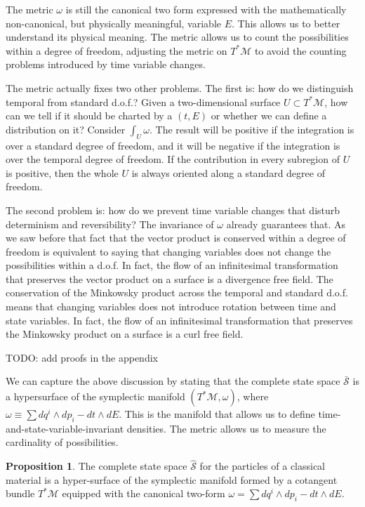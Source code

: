 \documentclass[aps,pra,10pt,twocolumn,floatfix,nofootinbib]{revtex4-1}
\numberwithin{equation}{section}
\theoremstyle{definition}
\newtheorem{prop}[equation]{Proposition}
\begin{document}
The metric $\omega$ is still the canonical two form expressed with the mathematically non-canonical, but physically meaningful, variable $E$. This allows us to better understand its physical meaning. The metric allows us to count the possibilities within a degree of freedom, adjusting the metric on $T^*\mathcal{M}$ to avoid the counting problems introduced by time variable changes.

The metric actually fixes two other problems. The first is: how do we distinguish temporal from standard d.o.f.? Given a two-dimensional surface $U \subset T^*\mathcal{M}$, how can we tell if it should be charted by a $(t,E)$ or whether we can define a distribution on it? Consider $\int_U \omega$. The result will be positive if the integration is over a standard degree of freedom, and it will be negative if the integration is over the temporal degree of freedom. If the contribution in every subregion of $U$ is positive, then the whole $U$ is always oriented along a standard degree of freedom.

The second problem is: how do we prevent time variable changes that disturb determinism and reversibility? The invariance of $\omega$ already guarantees that. As we saw before that fact that the vector product is conserved within a degree of freedom is equivalent to saying that changing variables does not change the possibilities within a d.o.f. In fact, the flow of an infinitesimal transformation that preserves the vector product on a surface is a divergence free field. The conservation of the Minkowsky product across the temporal and standard d.o.f. means that changing variables does not introduce rotation between time and state variables. In fact, the flow of an infinitesimal transformation that preserves the Minkowsky product on a surface is a curl free field.

TODO: add proofs in the appendix

We can capture the above discussion by stating that the complete state space $\bar{\mathcal{S}}$ is a hypersurface of the symplectic manifold $(T^*\mathcal{M}, \omega)$, where $\omega \equiv \sum dq^i \wedge dp_i - dt \wedge dE$. This is the manifold that allows us to define time-and-state-variable-invariant densities. The metric allows us to measure the cardinality of possibilities. 

\begin{prop}\label{relativistic_symplectic_manifold}
	The complete state space $\hat{\mathcal{S}}$ for the particles of a classical material is a hyper-surface of the symplectic manifold formed by a cotangent bundle $T^*\mathcal{M}$ equipped with the canonical two-form $\omega = \sum dq^i \wedge dp_i - dt \wedge dE$.
\end{prop}
\end{document}
